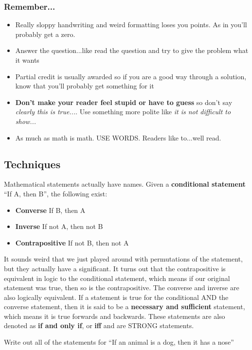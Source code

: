 \subsubsection{Remember...}
\begin{itemize}
    \item Really sloppy handwriting and weird formatting loses you points. As in you'll probably get a zero.
    \item Answer the question...like read the question and try to give the problem what it wants
    \item Partial credit is usually awarded so if you are a good way through a solution, know that you'll probably get something for it
    \item \textbf{Don't make your reader feel stupid or have to guess} so don't say \textit{clearly this is true...}. Use something more polite like \textit{it is not difficult to show...}
    \item As much as math is math. USE WORDS. Readers like to...well read.
\end{itemize}

\subsection{Techniques}
Mathematical statements actually have names. Given a \textbf{conditional statement} ``If A, then B'', the following exist:
\begin{itemize}
    \item \textbf{Converse} If B, then A
    \item \textbf{Inverse} If not A, then not B
    \item \textbf{Contrapositive} If not B, then not A
\end{itemize}

It sounds weird that we just played around with permutations of the statement, but they actually have a significant. It turns out that the contrapositive is equivalent in logic to the conditional statement, which means if our original statement was true, then so is the contrapositive. The converse and inverse are also logically equivalent. If a statement is true for the conditional AND the converse statement, then it is said to be a \textbf{necessary and sufficient} statement, which means it is true forwards and backwards. These statements are also denoted as \textbf{if and only if}, or \textbf{iff} and are STRONG statements.

\begin{problem}
Write out all of the statements for ``If an animal is a dog, then it has a nose''
\end{problem}

